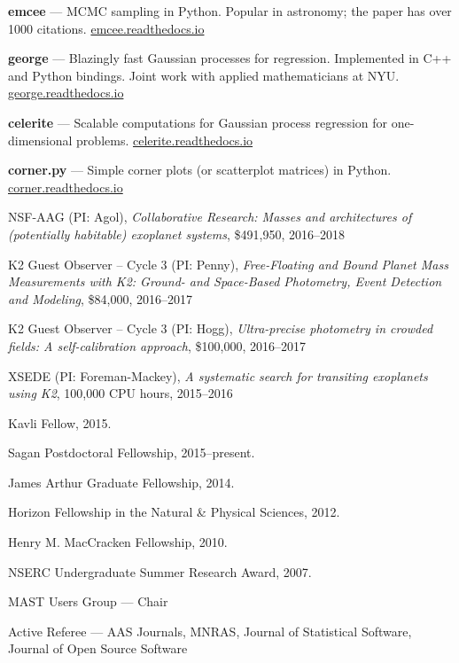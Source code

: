 \documentclass[12pt,letterpaper]{article}
\begin{document}
\begin{list}{}{\cvlist}

\item {\bf emcee} ---
    MCMC sampling in Python. Popular in astronomy;
    the paper has over 1000 citations.
    \url{emcee.readthedocs.io}

\item {\bf george} ---
    Blazingly fast Gaussian processes for regression. Implemented in C++ and
    Python bindings. Joint work with applied mathematicians at NYU.
    \url{george.readthedocs.io}

\item {\bf celerite} ---
    Scalable computations for Gaussian process regression for one-dimensional
    problems.
    \url{celerite.readthedocs.io}

\item {\bf corner.py} ---
    Simple corner plots (or scatterplot matrices) in Python.
    \url{corner.readthedocs.io}

\end{list}

\begin{list}{}{\cvlist}
\item
NSF-AAG (PI: Agol),
\emph{Collaborative Research: Masses and architectures of (potentially
    habitable) exoplanet systems},
\$491,950, 2016--2018
\item
K2 Guest Observer -- Cycle 3 (PI: Penny),
\emph{Free-Floating and Bound Planet Mass Measurements with K2: Ground- and
Space-Based Photometry, Event Detection and Modeling},
\$84,000, 2016--2017
\item
K2 Guest Observer -- Cycle 3 (PI: Hogg),
\emph{Ultra-precise photometry in crowded fields: A self-calibration
approach},
\$100,000, 2016--2017
\item
XSEDE (PI: Foreman-Mackey),
\emph{A systematic search for transiting exoplanets using K2},
100,000 CPU hours, 2015--2016
\end{list}


\begin{list}{}{\cvlist}

\item Kavli Fellow, 2015.
\item Sagan Postdoctoral Fellowship, 2015--present.
\item James Arthur Graduate Fellowship, 2014.
\item Horizon Fellowship in the Natural \& Physical Sciences, 2012.
\item Henry M. MacCracken Fellowship, 2010.
\item NSERC Undergraduate Summer Research Award, 2007.

\end{list}


\begin{list}{}{\cvlist}
\item MAST Users Group --- Chair
\item Active Referee ---
    AAS Journals,
    MNRAS,
    Journal of Statistical Software,
    Journal of Open Source Software
\end{list}
\end{document}
